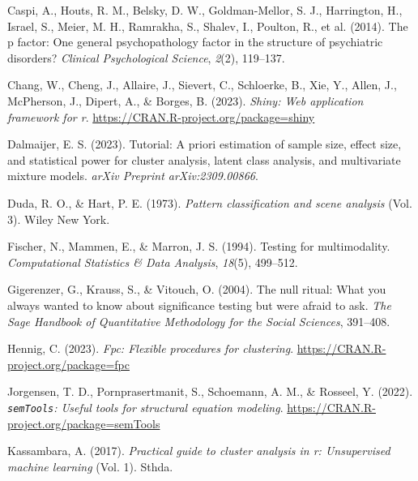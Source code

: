\documentclass[
  man,floatsintext]{apa7}
\newlength{\cslhangindent}
\newlength{\cslentryspacingunit} %
\newenvironment{CSLReferences}[2] %
 {%
  \setlength{\parindent}{0pt}
  \ifodd #1
  \let\oldpar\par
  \def\par{\hangindent=\cslhangindent\oldpar}
  \fi
  \setlength{\parskip}{#2\cslentryspacingunit}
 }%
 {}
\begin{document}
\hypertarget{refs}{}
\begin{CSLReferences}{1}{0}
\leavevmode{}%
Caspi, A., Houts, R. M., Belsky, D. W., Goldman-Mellor, S. J., Harrington, H., Israel, S., Meier, M. H., Ramrakha, S., Shalev, I., Poulton, R., et al. (2014). The p factor: One general psychopathology factor in the structure of psychiatric disorders? \emph{Clinical Psychological Science}, \emph{2}(2), 119--137.

\leavevmode{}%
Chang, W., Cheng, J., Allaire, J., Sievert, C., Schloerke, B., Xie, Y., Allen, J., McPherson, J., Dipert, A., \& Borges, B. (2023). \emph{Shiny: Web application framework for r}. \url{https://CRAN.R-project.org/package=shiny}

\leavevmode{}%
Dalmaijer, E. S. (2023). Tutorial: A priori estimation of sample size, effect size, and statistical power for cluster analysis, latent class analysis, and multivariate mixture models. \emph{arXiv Preprint arXiv:2309.00866}.

\leavevmode{}%
Duda, R. O., \& Hart, P. E. (1973). \emph{Pattern classification and scene analysis} (Vol. 3). Wiley New York.

\leavevmode{}%
Fischer, N., Mammen, E., \& Marron, J. S. (1994). Testing for multimodality. \emph{Computational Statistics \& Data Analysis}, \emph{18}(5), 499--512.

\leavevmode{}%
Gigerenzer, G., Krauss, S., \& Vitouch, O. (2004). The null ritual: What you always wanted to know about significance testing but were afraid to ask. \emph{The Sage Handbook of Quantitative Methodology for the Social Sciences}, 391--408.

\leavevmode{}%
Hennig, C. (2023). \emph{Fpc: Flexible procedures for clustering}. \url{https://CRAN.R-project.org/package=fpc}

\leavevmode{}%
Jorgensen, T. D., Pornprasertmanit, S., Schoemann, A. M., \& Rosseel, Y. (2022). \emph{\texttt{semTools}: {U}seful tools for structural equation modeling}. \url{https://CRAN.R-project.org/package=semTools}

\leavevmode{}%
Kassambara, A. (2017). \emph{Practical guide to cluster analysis in r: Unsupervised machine learning} (Vol. 1). Sthda.


\end{CSLReferences}
\end{document}
